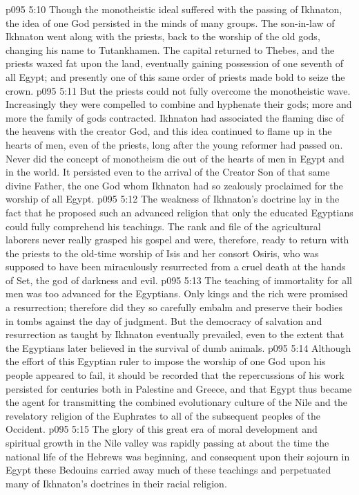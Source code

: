 \vs p095 5:10 \pc Though the monotheistic ideal suffered with the passing of Ikhnaton, the idea of one God persisted in the minds of many groups. The son\hyp{}in\hyp{}law of Ikhnaton went along with the priests, back to the worship of the old gods, changing his name to Tutankhamen. The capital returned to Thebes, and the priests waxed fat upon the land, eventually gaining possession of one seventh of all Egypt; and presently one of this same order of priests made bold to seize the crown.
\vs p095 5:11 But the priests could not fully overcome the monotheistic wave. Increasingly they were compelled to combine and hyphenate their gods; more and more the family of gods contracted. Ikhnaton had associated the flaming disc of the heavens with the creator God, and this idea continued to flame up in the hearts of men, even of the priests, long after the young reformer had passed on. Never did the concept of monotheism die out of the hearts of men in Egypt and in the world. It persisted even to the arrival of the Creator Son of that same divine Father, the one God whom Ikhnaton had so zealously proclaimed for the worship of all Egypt.
\vs p095 5:12 The weakness of Ikhnaton’s doctrine lay in the fact that he proposed such an advanced religion that only the educated Egyptians could fully comprehend his teachings. The rank and file of the agricultural laborers never really grasped his gospel and were, therefore, ready to return with the priests to the old\hyp{}time worship of Isis and her consort Osiris, who was supposed to have been miraculously resurrected from a cruel death at the hands of Set, the god of darkness and evil.
\vs p095 5:13 The teaching of immortality for all men was too advanced for the Egyptians. Only kings and the rich were promised a resurrection; therefore did they so carefully embalm and preserve their bodies in tombs against the day of judgment. But the democracy of salvation and resurrection as taught by Ikhnaton eventually prevailed, even to the extent that the Egyptians later believed in the survival of dumb animals.
\vs p095 5:14 \pc Although the effort of this Egyptian ruler to impose the worship of one God upon his people appeared to fail, it should be recorded that the repercussions of his work persisted for centuries both in Palestine and Greece, and that Egypt thus became the agent for transmitting the combined evolutionary culture of the Nile and the revelatory religion of the Euphrates to all of the subsequent peoples of the Occident.
\vs p095 5:15 The glory of this great era of moral development and spiritual growth in the Nile valley was rapidly passing at about the time the national life of the Hebrews was beginning, and consequent upon their sojourn in Egypt these Bedouins carried away much of these teachings and perpetuated many of Ikhnaton’s doctrines in their racial religion.

